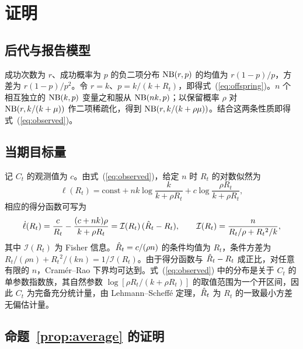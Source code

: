 \appendix
{}
\renewcommand{\theequation}{\thesection.\arabic{equation}}

\section{证明}
\label{app:proofs}

\subsection{后代与报告模型}
\label{app:model}

成功次数为 $r$、成功概率为 $p$ 的负二项分布 $\mathrm{NB}(r,p)$ 的均值为 $r(1-p)/p$，方差为 $r(1-p)/p^2$。令 $r=k$、$p=k/(k+R_t)$，即得式~(\ref{eq:offspring})。$n$ 个相互独立的 $\mathrm{NB}(k,p)$ 变量之和服从 $\mathrm{NB}(nk,p)$；以保留概率 $\rho$ 对 $\mathrm{NB}(r,k/(k+\mu))$ 作二项稀疏化，得到 $\mathrm{NB}(r,k/(k+\rho\mu))$。结合这两条性质即得式~(\ref{eq:observed})。

\subsection{当期目标量}
\label{app:target1}

记 $C_t$ 的观测值为 $c$。由式~(\ref{eq:observed})，给定 $n$ 时 $R_t$ 的对数似然为
\begin{equation}
  \ell(R_t)=\text{const}+nk\log\frac{k}{k+\rho R_t}+c\log\frac{\rho R_t}{k+\rho R_t},
\end{equation}
相应的得分函数可写为
\begin{equation}
  \dot{\ell}(R_t)=\frac{c}{R_t}-\frac{(c+nk)\rho}{k+\rho R_t}=\mathcal{I}(R_t)\,(\hat{R}_t-R_t),\qquad
  \mathcal{I}(R_t)=\frac{n}{R_t/\rho+R_t{}^2/k},
  \label{eq:score}
\end{equation}
其中 $\mathcal{I}(R_t)$ 为 Fisher 信息。$\hat{R}_t=c/(\rho n)$ 的条件均值为 $R_t$，条件方差为 $R_t/(\rho n)+R_t{}^2/(kn)=1/\mathcal{I}(R_t)$。由于得分函数与 $\hat{R}_t-R_t$ 成正比，对任意有限的 $n$，Cram\'er--Rao 下界均可达到。式~(\ref{eq:observed}) 中的分布是关于 $C_t$ 的单参数指数族，其自然参数 $\log[\rho R_t/(k+\rho R_t)]$ 的取值范围为一个开区间，因此 $C_t$ 为完备充分统计量，由 Lehmann--Scheff\'e 定理，$\hat{R}_t$ 为 $R_t$ 的一致最小方差无偏估计量\citep{lehmann1998theory, lehmann2005testing}。

\subsection{命题~\ref{prop:average} 的证明}
\label{app:prop1}

